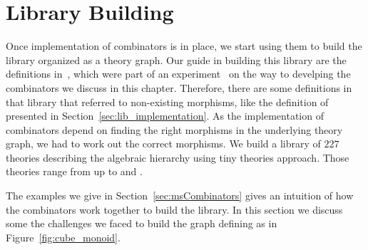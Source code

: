 \section{Library Building}
\label{sec:guidelines}
Once implementation of combinators is in place, we start using them to build the library organized as a theory graph. Our guide in building this library are the definitions in~, which were part of an experiment~\cite{mathscheme2011experiments} on the way to develping the combinators we discuss in this chapter. Therefore, there are some definitions in that library that referred to non-existing morphisms, like the definition of  presented in Section~\ref{sec:lib_implementation}. As the implementation of combinators depend on finding the right morphisms in the underlying theory graph, we had to work out the correct morphisms. We build a library of $227$ theories describing the algebraic hierarchy using tiny theories approach. Those theories range from  up to  and  .
 
The examples we give in Section~\ref{sec:msCombinators} gives an intuition of how the combinators work together to build the library. In this section we discuss some the challenges we faced to build the graph defining  as in Figure~\ref{fig:cube_monoid}.  

